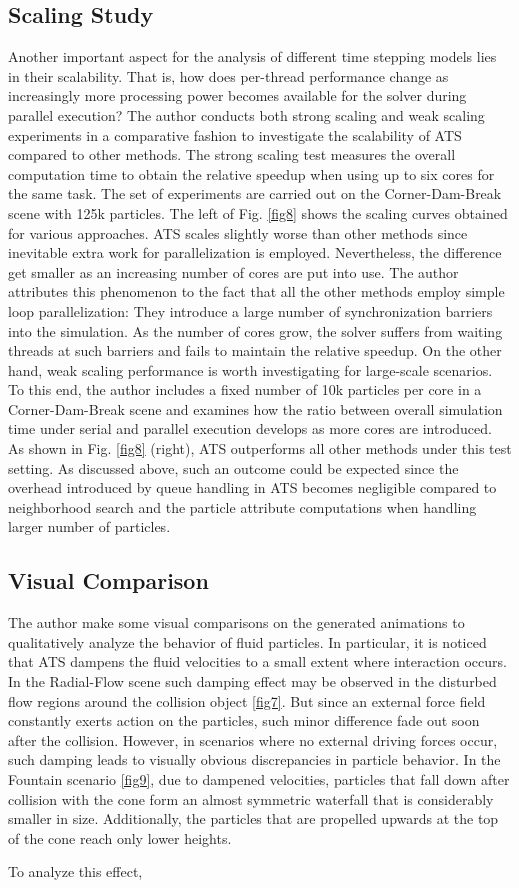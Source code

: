 \documentclass[
	11pt, 
	DIV10,
	ngerman,
	a4paper, 
	oneside, 
	headings=normal, 
	captions=tableheading,
	final, 
	numbers=noenddot
]{scrartcl}
\begin{document}
\subsection{Scaling Study}
Another important aspect for the analysis of different time stepping models lies in their scalability. That is, how does per-thread performance change as increasingly more processing power becomes available for the solver during parallel execution? The author conducts both strong scaling and weak scaling experiments in a comparative fashion to investigate the scalability of ATS compared to other methods. The strong scaling test measures the overall computation time to obtain the relative speedup when using up to six cores for the same task. The set of experiments are carried out on the Corner-Dam-Break scene with 125k particles. The left of Fig. \ref{fig8} shows the scaling curves obtained for various approaches. ATS scales slightly worse than other methods since inevitable extra work for parallelization is employed. Nevertheless, the difference get smaller as an increasing number of cores are put into use. The author attributes this phenomenon to the fact that all the other methods employ simple loop parallelization: They introduce a large number of synchronization barriers into the simulation. As the number of cores grow, the solver suffers from waiting threads at such barriers and fails to maintain the relative speedup. On the other hand, weak scaling performance is worth investigating for large-scale scenarios. To this end, the author includes a fixed number of 10k particles per core in a Corner-Dam-Break scene and examines how the ratio between overall simulation time under serial and parallel execution develops as more cores are introduced. As shown in Fig. \ref{fig8} (right), ATS outperforms all other methods under this test setting. As discussed above, such an outcome could be expected since the overhead introduced by queue handling in ATS becomes negligible compared to neighborhood search and the particle attribute computations when handling larger number of particles.

\subsection{Visual Comparison}
The author make some visual comparisons on the generated animations to qualitatively analyze the behavior of fluid particles. In particular, it is noticed that ATS dampens the fluid velocities to a small extent where interaction occurs. In the Radial-Flow scene such damping effect may be observed in the disturbed flow regions around the collision object \ref{fig7}. But since an external force field constantly exerts action on the particles, such minor difference fade out soon after the collision. However, in scenarios where no external driving forces occur, such damping leads to visually obvious discrepancies in particle behavior. In the Fountain scenario \ref{fig9}, due to dampened velocities, particles that fall down after collision with the cone form an almost symmetric waterfall that is considerably smaller in size. Additionally, the particles that are propelled upwards at the top of the cone reach only lower heights.
\par
To analyze this effect, 
\end{document}

